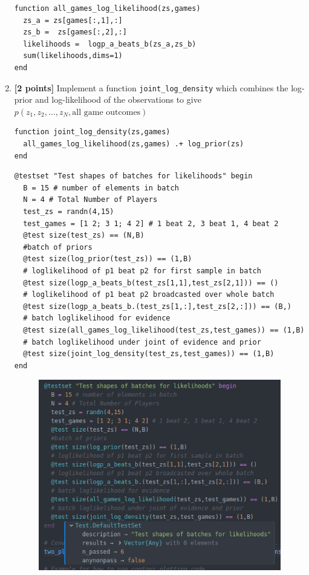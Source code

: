 \documentclass{article}
\begin{document}
\begin{enumerate}[label=(\alph*)]
\begin{verbatim}
function all_games_log_likelihood(zs,games)
  zs_a = zs[games[:,1],:]
  zs_b =  zs[games[:,2],:]
  likelihoods =  logp_a_beats_b(zs_a,zs_b)
  sum(likelihoods,dims=1)
end
\end{verbatim}
  
\item {\bf [2 points]} Implement a function \texttt{joint\_log\_density} which combines the log-prior and log-likelihood of the observations to give $p(z_1, z_2, \dots, z_N, \text{all game outcomes})$

\begin{verbatim}
function joint_log_density(zs,games)
  all_games_log_likelihood(zs,games) .+ log_prior(zs)
end
\end{verbatim}
  
\pagebreak
  
\begin{verbatim}
@testset "Test shapes of batches for likelihoods" begin
  B = 15 # number of elements in batch
  N = 4 # Total Number of Players
  test_zs = randn(4,15)
  test_games = [1 2; 3 1; 4 2] # 1 beat 2, 3 beat 1, 4 beat 2
  @test size(test_zs) == (N,B)
  #batch of priors
  @test size(log_prior(test_zs)) == (1,B)
  # loglikelihood of p1 beat p2 for first sample in batch
  @test size(logp_a_beats_b(test_zs[1,1],test_zs[2,1])) == ()
  # loglikelihood of p1 beat p2 broadcasted over whole batch
  @test size(logp_a_beats_b.(test_zs[1,:],test_zs[2,:])) == (B,)
  # batch loglikelihood for evidence
  @test size(all_games_log_likelihood(test_zs,test_games)) == (1,B)
  # batch loglikelihood under joint of evidence and prior
  @test size(joint_log_density(test_zs,test_games)) == (1,B)
end
\end{verbatim}

\begin{figure}[h]
  \centering
  \includegraphics[width=12cm,keepaspectratio]{plots/testcase.png}
\end{figure}

\end{enumerate}
\end{document}
